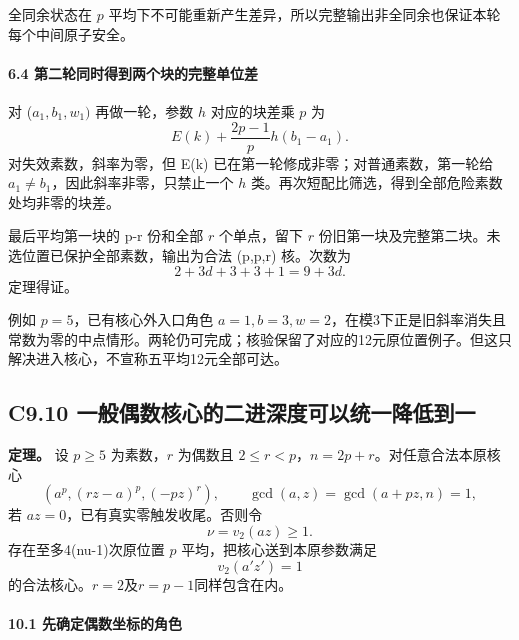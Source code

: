 {全同余状态在} {\ensuremath{p}} {平均下不可能重新产生差异，所以完整输出非全同余也保证本轮每个中间原子安全。}

\paragraph*{\texorpdfstring{{6.4} {第二轮同时得到两个块的完整单位差}}{6.4 第二轮同时得到两个块的完整单位差}}\label{C9-h69}

{对} {(\ensuremath{a_{1},b_{1},w_{1})}} {再做一轮，参数} {\ensuremath{h}} {对应的块差乘} {\ensuremath{p}} {为} \[
E(k)+\frac{2p-1}{p}h(b_1-a_1).
\tag{C9.17}
\] {对失效素数，斜率为零，但} {E(k)} {已在第一轮修成非零；对普通素数，第一轮给} {\ensuremath{a_{1}\ne b_{1}}，因此斜率非零，只禁止一个} {\ensuremath{h}} {类。再次短配比筛选，得到全部危险素数处均非零的块差。}

{最后平均第一块的} {p-r} {份和全部} {\ensuremath{r}} {个单点，留下} {\ensuremath{r}} {份旧第一块及完整第二块。未选位置已保护全部素数，输出为合法} {(p,p,r)} {核。次数为} \[
2+3d+3+3+1=9+3d.
\] {定理得证。}

{例如} {\ensuremath{p=5}，已有核心外入口角色} {\ensuremath{a=1,b=3,w=2}，在模3下正是旧斜率消失且常数为零的中点情形。两轮仍可完成；核验保留了对应的12元原位置例子。但这只解决进入核心，不宣称五平均12元全部可达。}

\subsection*{\texorpdfstring{{C9.10} {一般偶数核心的二进深度可以统一降低到一}}{C9.10 一般偶数核心的二进深度可以统一降低到一}}\label{C9-h70}

\textbf{{定理。}} {设} {\ensuremath{p\ge 5}} {为素数，\ensuremath{r}} {为偶数且} {\ensuremath{2\le r<p}，\ensuremath{n=2p+r}。对任意合法本原核心} \[
(a^p,(rz-a)^p,(-pz)^r),\qquad
\gcd(a,z)=\gcd(a+pz,n)=1,
\] {若} {\ensuremath{az=0}，已有真实零触发收尾。否则令} \[
\nu=v_2(az)\ge1.
\] {存在至多4(nu-1)次原位置} {\ensuremath{p}} {平均，把核心送到本原参数满足} \[
\boxed{v_2(a'z')=1}
\tag{C9.19}
\] {的合法核心。\ensuremath{r=2}及\ensuremath{r=p-1}同样包含在内。}

\paragraph*{\texorpdfstring{{10.1} {先确定偶数坐标的角色}}{10.1 先确定偶数坐标的角色}}\label{C9-h71}

